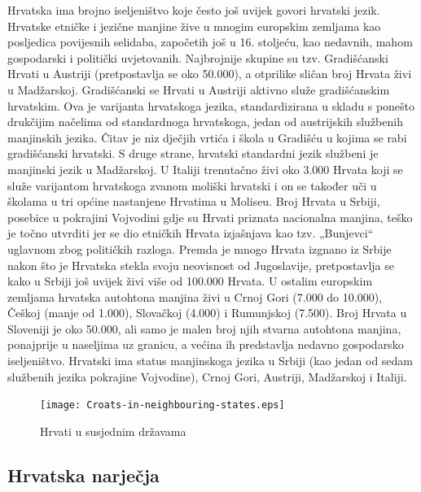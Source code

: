 \begin{multicols}{2}
Hrvatska ima brojno iseljeništvo koje često još uvijek govori hrvatski jezik. Hrvatske etničke i jezične manjine žive u mnogim europskim zemljama kao posljedica povijesnih selidaba, započetih još u 16. stoljeću, kao nedavnih, mahom gospodarski i politički uvjetovanih. Najbrojnije skupine su tzv. Gradišćanski Hrvati u Austriji (pretpostavlja se oko 50.000), a otprilike sličan broj Hrvata živi u Madžarskoj. Gradišćanski se Hrvati u Austriji aktivno služe gradišćanskim hrvatskim. Ova je varijanta hrvatskoga jezika, standardizirana u skladu s ponešto drukčijim načelima od standardnoga hrvatskoga, jedan od austrijskih službenih manjinskih jezika. Čitav je niz dječjih vrtića i škola u Gradišću u kojima se rabi gradišćanski hrvatski. S druge strane, hrvatski standardni jezik službeni je manjinski jezik u Madžarskoj. U Italiji trenutačno živi oko 3.000 Hrvata koji se služe varijantom hrvatskoga zvanom moliški hrvatski i on se također uči u školama u tri općine nastanjene Hrvatima u Moliseu. Broj Hrvata u Srbiji, posebice u pokrajini Vojvodini gdje su Hrvati priznata nacionalna manjina, teško je točno utvrditi jer se dio etničkih Hrvata izjašnjava kao tzv. „Bunjevci“ uglavnom zbog političkih razloga. Premda je mnogo Hrvata izgnano iz Srbije nakon što je Hrvatska stekla svoju neovisnost od Jugoslavije, pretpostavlja se kako u Srbiji još uvijek živi više od 100.000 Hrvata. U ostalim europskim zemljama hrvatska autohtona manjina živi u Crnoj Gori (7.000 do 10.000), Češkoj (manje od 1.000), Slovačkoj (4.000) i Rumunjskoj (7.500). Broj Hrvata u Sloveniji je oko 50.000, ali samo je malen broj njih stvarna autohtona manjina, ponajprije u naseljima uz granicu, a većina ih predstavlja nedavno gospodarsko iseljeništvo. Hrvatski ima status manjinskoga jezika u Srbiji (kao jedan od sedam službenih jezika pokrajine Vojvodine), Crnoj Gori, Austriji, Madžarskoj i Italiji.

\begin{figure}[htb]
  \center
  \texttt{[image: Croats-in-neighbouring-states.eps]}
  \caption{Hrvati u susjednim državama \cite{boo2}}
  \label{fig:hrvati}
\end{figure}

\subsection{Hrvatska narječja}


\end{multicols}
